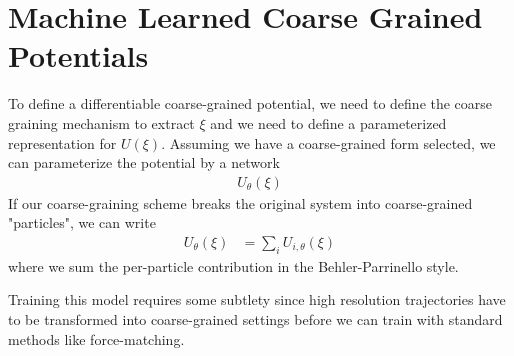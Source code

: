 \documentclass[book.tex]{subfiles}
\begin{document}
\section{Machine Learned Coarse Grained Potentials}

To define a differentiable coarse-grained potential, we need to define the coarse graining mechanism to extract $\xi$ and we need to define a parameterized representation for $U(\xi)$. Assuming we have a coarse-grained form selected, we can parameterize the potential by a network
\begin{align}
U_\theta(\xi)
\end{align}
If our coarse-graining scheme breaks the original system into coarse-grained "particles", we can write
\begin{align}
U_\theta(\xi) &= \sum_i U_{i,\theta}(\xi)
\end{align}
where we sum the per-particle contribution in the Behler-Parrinello style.

Training this model requires some subtlety since high resolution trajectories have to be transformed into coarse-grained settings before we can train with standard methods like force-matching.
\end{document}
